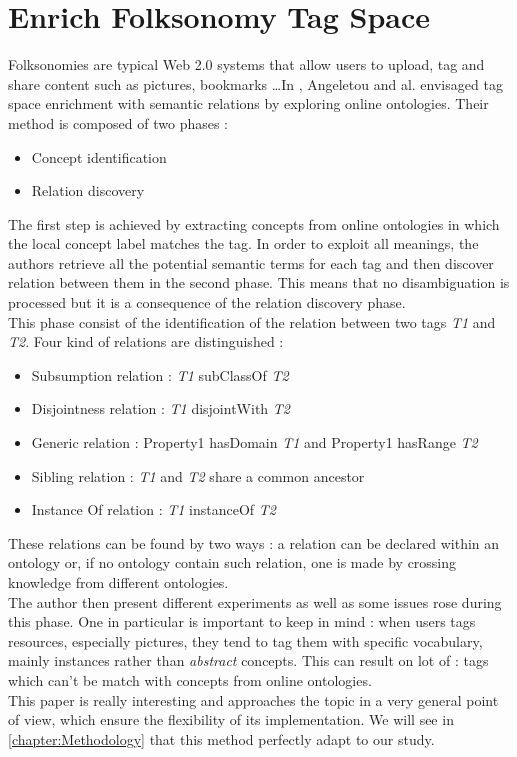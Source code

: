 \section{Enrich Folksonomy Tag Space} %
\label{sec:enrich_folksonomy_tag_space}
Folksonomies are typical Web 2.0 systems that allow users to upload, tag and share content such as pictures, bookmarks \dots In \cite{angeletou2007bridging}, Angeletou and al. envisaged tag space enrichment with semantic relations by exploring online ontologies. Their method is composed of two phases :
\begin{itemize}
	\item Concept identification 
	\item Relation discovery
\end{itemize}
The first step is achieved by extracting concepts from online ontologies in which the local concept label matches the tag. In order to exploit all meanings, the authors retrieve all the potential semantic terms for each tag and then discover relation between them in the second phase. This means that no disambiguation is processed but it is a consequence of the relation discovery phase.\\
This phase consist of the identification of the relation between two tags \emph{T1} and \emph{T2}. Four kind of relations are distinguished :
\begin{itemize}
	\item Subsumption relation : \emph{T1} subClassOf \emph{T2}
	\item Disjointness relation : \emph{T1} disjointWith \emph{T2}
	\item Generic relation : Property1 hasDomain \emph{T1} and Property1 hasRange \emph{T2}
	\item Sibling relation : \emph{T1} and \emph{T2} share a common ancestor
	\item Instance Of relation : \emph{T1} instanceOf \emph{T2}
\end{itemize}
These relations can be found by two ways : a relation can be declared within an ontology or, if no ontology contain such relation, one is made by crossing knowledge from different ontologies.\\

The author then present different experiments as well as some issues rose during this phase. One in particular is important to keep in mind : when users tags resources, especially pictures, they tend to tag them with specific vocabulary, mainly instances rather than \emph{abstract} concepts. This can result on lot of  : tags which can't be match with concepts from online ontologies.\\

This paper is really interesting and approaches the topic in a very general point of view, which ensure the flexibility of its implementation. We will see in \ref{chapter:Methodology} that this method perfectly adapt to our study. 
